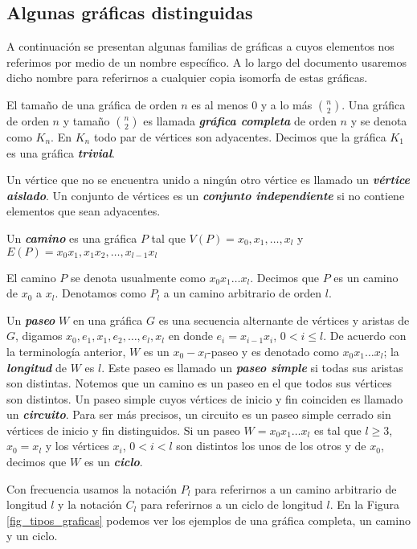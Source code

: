 \subsection{Algunas gráficas distinguidas}

A continuación se presentan algunas familias de gráficas a cuyos elementos nos referimos por medio de un nombre específico. A lo largo del documento usaremos dicho nombre para referirnos a cualquier copia isomorfa de estas gráficas.

El tamaño de una gráfica de orden $n$ es al menos $0$ y a lo más $\binom{n}{2}$. Una gráfica de orden $n$ y tamaño $\binom{n}{2}$ es llamada \textbf{\emph{gráfica completa}} de orden $n$ y se denota como $K_n$. En $K_n$ todo par de vértices son adyacentes. Decimos que la gráfica $K_1$ es una gráfica \textbf{\emph{trivial}}.

Un vértice que no se encuentra unido a ningún otro vértice es llamado un \textbf{\emph{vértice aislado}}. Un conjunto de vértices es un \textbf{\emph{conjunto independiente}} si no contiene elementos que sean adyacentes.

Un \textbf{\emph{camino}} es una gráfica $P$ tal que  $V(P) = {x_0,x_1,\dots,x_l}$ y $E(P) = {x_0x_1,x_1x_2,\dots,x_{l-1}x_l}$

El camino $P$ se denota usualmente como $x_0x_1\dots x_l$. Decimos que $P$ es un camino de $x_0$ a $x_l$. Denotamos como $P_l$ a un camino arbitrario de orden $l$.

Un \textbf{\emph{paseo}} $W$ en una gráfica $G$ es una secuencia alternante de vértices y aristas de $G$, digamos $x_0, e_1, x_1, e_2, \dots, e_l, x_l$ en donde $e_i=x_{i-1}x_i$, $0<i\leq l$. De acuerdo con la terminología anterior, $W$ es un $x_0-x_l$-paseo y es denotado como $x_0x_1\dots x_l$; la \textbf{\emph{longitud}} de $W$ es $l$. Este paseo es llamado un  \textbf{\emph{paseo simple}} si todas sus aristas son distintas. Notemos que un camino es un paseo en el que todos sus vértices son distintos. Un paseo simple cuyos vértices de inicio y fin coinciden es llamado un \textbf{\emph{circuito}}. Para ser más precisos, un circuito es un paseo simple cerrado sin vértices de inicio y fin distinguidos. Si un paseo $W = x_0x_1\dots x_l$ es tal que $l\geq 3$, $x_0=x_l$ y los vértices $x_i$, $0<i<l$ son distintos los unos de los otros y de $x_0$, decimos que $W$ es un \textbf{\emph{ciclo}}.

Con frecuencia usamos la notación $P_l$ para referirnos a un camino arbitrario de longitud $l$ y la notación $C_l$ para referirnos a un ciclo de longitud $l$. En la Figura \ref{fig_tipos_graficas} podemos ver los ejemplos de una gráfica completa, un camino y un ciclo.

